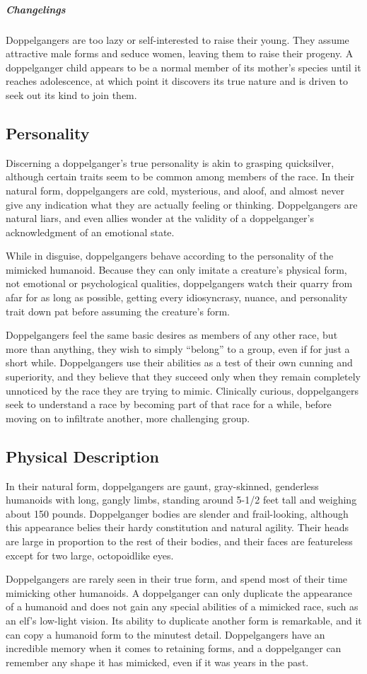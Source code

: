 \subparagraph{Changelings}
{Doppelgangers are too lazy or self-interested to raise their young. They assume attractive male forms and seduce women, leaving them to raise their progeny. A doppelganger child appears to be a normal member of its mother's species until it reaches adolescence, at which point it discovers its true nature and is driven to seek out its kind to join them. \cite{d-sre}}

\subsection{Personality}
{Discerning a doppelganger’s true personality is akin to grasping quicksilver, although certain traits seem to be common among members of the race. In their natural form, doppelgangers are cold, mysterious, and aloof, and almost never give any indication what they are actually feeling or thinking. Doppelgangers are natural liars, and even allies wonder at the validity of a doppelganger’s acknowledgment of an emotional state.

While in disguise, doppelgangers behave according to the personality of the mimicked humanoid. Because they can only imitate a creature’s physical form, not emotional or psychological qualities, doppelgangers watch their quarry from afar for as long as possible, getting every idiosyncrasy, nuance, and personality trait down pat before assuming the creature’s form.

Doppelgangers feel the same basic desires as members of any other race, but more than anything, they wish to simply “belong” to a group, even if for just a short while. Doppelgangers use their abilities as a test of their own cunning and superiority, and they believe that they succeed only when they remain completely unnoticed by the race they are trying to mimic. Clinically curious, doppelgangers seek to understand a race by becoming part of that race for a while, before moving on to infiltrate another, more challenging group. \cite{d-destiny}}

\subsection{Physical Description}
{In their natural form, doppelgangers are gaunt, gray-skinned, genderless humanoids with long, gangly limbs, standing around 5-1/2 feet tall and weighing about 150 pounds. Doppelganger bodies are slender and frail-looking, although this appearance belies their hardy constitution and natural agility. Their heads are large in proportion to the rest of their bodies, and their faces are featureless except for two large, octopoidlike eyes.

Doppelgangers are rarely seen in their true form, and spend most of their time mimicking other humanoids. A doppelganger can only duplicate the appearance of a humanoid and does not gain any special abilities of a mimicked race, such as an elf’s low-light vision. Its ability to duplicate another form is remarkable, and it can copy a humanoid form to the minutest detail. Doppelgangers have an incredible memory when it comes to retaining forms, and a doppelganger can remember any shape it has mimicked, even if it was years in the past. \cite{d-destiny}}

